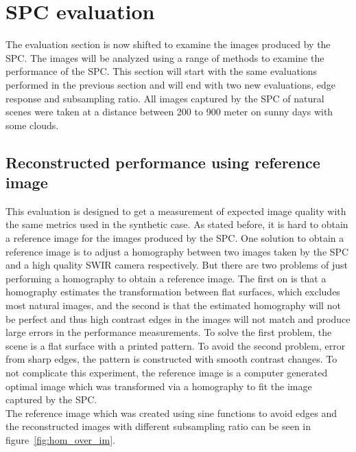 

\section{SPC evaluation}
\label{sec:eval_spc}
The evaluation section is now shifted to examine the images produced by the SPC. The images will be analyzed using a range of methods to examine the performance of the SPC. This section will start with the same evaluations performed in the previous section and will end with two new evaluations, edge response and subsampling ratio. All images captured by the SPC of natural scenes were taken at a distance between 200 to 900 meter on sunny days with some clouds.


\subsection{Reconstructed performance using reference image}
This evaluation is designed to get a measurement of expected image quality with the same metrics used in the synthetic case. As stated before, it is hard to obtain a reference image for the images produced by the SPC. One solution to obtain a reference image is to adjust a homography between two images taken by the SPC and a high quality SWIR camera respectively. But there are two problems of just performing a homography to obtain a reference image. The first on is that a homography estimates the transformation between flat surfaces, which excludes most natural images, and the second is that the estimated homography will not be perfect and thus high contrast edges in the images will not match and produce large errors in the performance measurements. To solve the first problem, the scene is a flat surface with a printed pattern. To avoid the second problem, error from sharp edges, the pattern is constructed with smooth contrast changes. To not complicate this experiment, the reference image is a computer generated optimal image which was transformed via a homography to fit the image captured by the SPC.\\[0.1in] 

The reference image which was created using sine functions to avoid edges and the reconstructed images with different subsampling ratio can be seen in figure~\ref{fig:hom_over_im}.   


